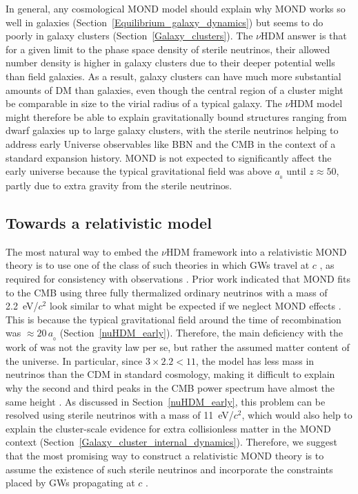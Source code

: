 \documentclass[fleqn,usenatbib,useAMS]{mnras} %
\begin{document}
In general, any cosmological MOND model should explain why MOND works so well in galaxies (Section~\ref{Equilibrium_galaxy_dynamics}) but seems to do poorly in galaxy clusters (Section~\ref{Galaxy_clusters}). The $\nu$HDM answer is that for a given limit to the phase space density of sterile neutrinos, their allowed number density is higher in galaxy clusters due to their deeper potential wells than field galaxies. As a result, galaxy clusters can have much more substantial amounts of DM than galaxies, even though the central region of a cluster might be comparable in size to the virial radius of a typical galaxy. The $\nu$HDM model might therefore be able to explain gravitationally bound structures ranging from dwarf galaxies up to large galaxy clusters, with the sterile neutrinos helping to address early Universe observables like BBN and the CMB in the context of a standard expansion history. MOND is not expected to significantly affect the early universe because the typical gravitational field was above $a_{_0}$ until $z \approx 50$, partly due to extra gravity from the sterile neutrinos.



\subsection{Towards a relativistic model}
\label{Relativistic_cosmological_model}

The most natural way to embed the $\nu$HDM framework into a relativistic MOND theory is to use one of the class of such theories in which GWs travel at $c$ \citep{Skordis_2019}, as required for consistency with observations \citep{LIGO_Virgo_2017}. Prior work indicated that MOND fits to the CMB using three fully thermalized ordinary neutrinos with a mass of 2.2~eV/$c^2$ \citep{Skordis_2006} look similar to what might be expected if we neglect MOND effects \citep{Angus_2009}. This is because the typical gravitational field around the time of recombination was $\approx 20 \, a_{_0}$ (Section~\ref{nuHDM_early}). Therefore, the main deficiency with the work of \citet{Skordis_2006} was not the gravity law per se, but rather the assumed matter content of the universe. In particular, since $3 \times 2.2 < 11$, the model has less mass in neutrinos than the CDM in standard cosmology, making it difficult to explain why the second and third peaks in the CMB power spectrum have almost the same height \citep{Planck_2020}. As discussed in Section~\ref{nuHDM_early}, this problem can be resolved using sterile neutrinos with a mass of 11~eV/$c^2$, which would also help to explain the cluster-scale evidence for extra collisionless matter in the MOND context (Section~\ref{Galaxy_cluster_internal_dynamics}). Therefore, we suggest that the most promising way to construct a relativistic MOND theory is to assume the existence of such sterile neutrinos and incorporate the constraints placed by GWs propagating at $c$ \citep{Skordis_2019}.
\end{document}
